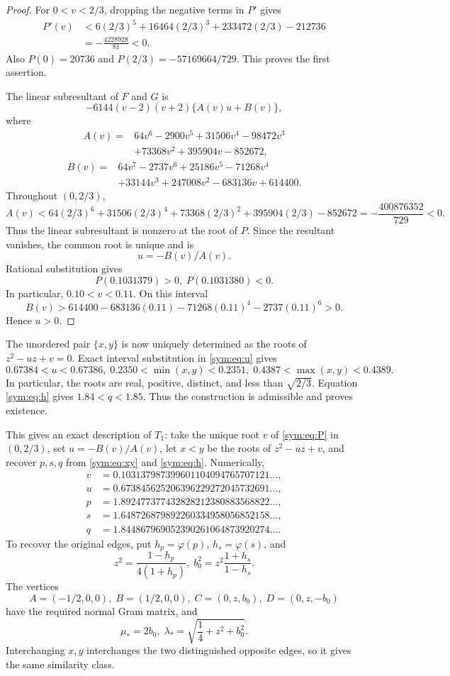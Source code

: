 \documentclass[11pt]{article}
\theoremstyle{definition}
\theoremstyle{remark}
\newcommand{\ph}{\varphi}
\begin{document}
\begin{proof}
For $0<v<2/3$, dropping the negative terms in $P'$ gives
\[
\begin{split}
P'(v)
&<6(2/3)^5+16464(2/3)^3+233472(2/3)-212736\\
&=-\frac{4228928}{81}<0.
\end{split}
\]
Also $P(0)=20736$ and $P(2/3)=-57169664/729$.
This proves the first assertion.

The linear subresultant of $F$ and $G$ is
\[
-6144(v-2)(v+2)\{A(v)u+B(v)\},
\]
where
\[
\begin{split}
A(v)={}&64v^6-2900v^5+31506v^4-98472v^3\\
&+73368v^2+395904v-852672,
\end{split}
\]
\[
\begin{split}
B(v)={}&64v^7-2737v^6+25186v^5-71268v^4\\
&+33144v^3+247008v^2-683136v+614400.
\end{split}
\]
Throughout $(0,2/3)$,
\[
A(v)<64(2/3)^6+31506(2/3)^4+73368(2/3)^2
+395904(2/3)-852672
=-\frac{400876352}{729}<0.
\]
Thus the linear subresultant is nonzero at the root of $P$.
Since the resultant vanishes, the common root is unique and is
\begin{equation}
u=-B(v)/A(v).
\label{sym:eq:u}
\end{equation}
Rational substitution gives
\[
P(0.1031379)>0,\; P(0.1031380)<0.
\]
In particular, $0.10<v<0.11$. On this interval
\[
B(v)>614400-683136(0.11)-71268(0.11)^4
-2737(0.11)^6>0.
\]
Hence $u>0$.
\end{proof}

The unordered pair $\{x,y\}$ is now uniquely determined as the roots
of $z^2-uz+v=0$. Exact interval substitution in \eqref{sym:eq:u} gives
\[
0.67384<u<0.67386,\;
0.2350<\min(x,y)<0.2351,\;
0.4387<\max(x,y)<0.4389.
\]
In particular, the roots are real, positive, distinct, and less than
$\sqrt{2/3}$. Equation \eqref{sym:eq:h} gives $1.84<q<1.85$.
Thus the construction is admissible and proves existence.

This gives an exact description of $T_1$:
take the unique root $v$ of \eqref{sym:eq:P} in $(0,2/3)$, set
$u=-B(v)/A(v)$, let $x<y$ be the roots of $z^2-uz+v$, and recover
$p,s,q$ from \eqref{sym:eq:xy} and \eqref{sym:eq:h}.
Numerically,
\[
\begin{aligned}
v&=0.103137987399601104094765707121\ldots,\\
u&=0.673845625206396229272045732691\ldots,\\
p&=1.892477377432828212380883568822\ldots,\\
s&=1.648726879892260334958056852158\ldots,\\
q&=1.844867969052390261064873920274\ldots .
\end{aligned}
\]
To recover the original edges, put $h_p=\ph(p)$, $h_s=\ph(s)$, and
\[
z^2=\frac{1-h_p}{4(1+h_p)},\;
b_0^2=z^2\frac{1+h_s}{1-h_s}.
\]
The vertices
\[
A=(-1/2,0,0),\; B=(1/2,0,0),\;
C=(0,z,b_0),\; D=(0,z,-b_0)
\]
have the required normal Gram matrix, and
\[
\mu_*=2b_0,\;
\lambda_*=\sqrt{\frac14+z^2+b_0^2}.
\]
Interchanging $x,y$ interchanges the two distinguished opposite edges,
so it gives the same similarity class.
\end{document}
